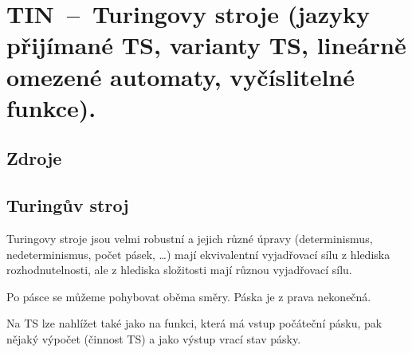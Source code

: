 

\graphicspath{{tin/turingovy_stroje/figures}}


\chapter{TIN~--~Turingovy stroje (jazyky přijímané TS, varianty TS, lineárně omezené automaty, vyčíslitelné funkce).}


\section{Zdroje}

\begin{compactitem}
    \item {}
    \item {}
    \item {}
    \item {}
\end{compactitem}


\section{Turingův stroj}

\begin{compactitem}
    \item Turingovy stroje jsou velmi robustní a jejich různé úpravy (determinismus, nedeterminismus, počet pásek, \dots) mají ekvivalentní vyjadřovací sílu z hlediska rozhodnutelnosti, ale z hlediska složitosti mají různou vyjadřovací sílu.

    \item Po pásce se můžeme pohybovat oběma směry. Páska je z prava nekonečná.

    \item Na TS lze nahlížet také jako na funkci, která má vstup počáteční pásku, pak nějaký výpočet (činnost TS) a jako výstup vrací stav pásky.
\end{compactitem}

